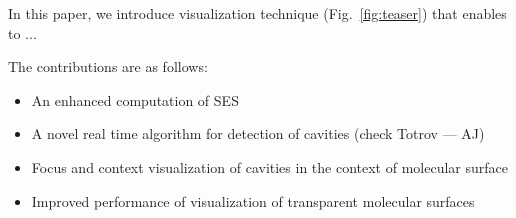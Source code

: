 In this paper, we introduce visualization technique (Fig.~\ref{fig:teaser}) that enables to ...

The contributions are as follows:
\begin{itemize}
  \item An enhanced computation of SES
  \item A novel real time algorithm for detection of cavities (check Totrov --- AJ)
  \item Focus and context visualization of cavities in the context of molecular surface
  \item Improved performance of visualization of transparent molecular surfaces
\end{itemize}